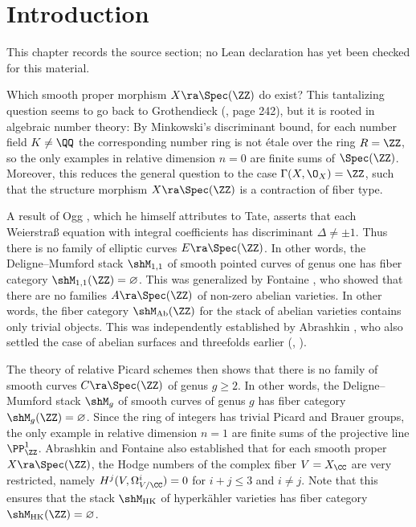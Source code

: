 \chapter{Introduction}
\label{no-enriques-surface-over-the-integers-chapter-01}

\begin{remark}
\label{no-enriques-surface-over-the-integers-chapter-01-source}
This chapter records the source section; no Lean declaration has yet been checked for this material.
\notready
\end{remark}

\label{Introduction}

Which   smooth proper morphism $X\ra\Spec(\ZZ)$ do exist?  This tantalizing question seems to go  back to
Grothendieck (\cite{Mazur-1986}, page 242), but it is rooted in algebraic number theory:
By   Minkowski's discriminant bound, for each number field $K\neq \QQ$ the corresponding
number ring  is not   \'etale over the ring $R=\ZZ$, so the only examples
in relative dimension $n=0$ are finite sums of $\Spec(\ZZ)$. Moreover, this reduces the general question  to  the
case $\Gamma(X,\O_X)=\ZZ$, such that the structure morphism  $X\ra\Spec(\ZZ)$ is a   contraction of fiber type.

A result of Ogg \cite{Ogg-1966}, which he himself attributes to Tate, asserts that each Weierstra\ss{} equation with integral
coefficients has discriminant $\Delta\neq \pm 1$.
Thus there is no family of elliptic curves
$E\ra\Spec(\ZZ)$. In other words, the Deligne--Mumford stack $\shM_{1,1}$ of smooth pointed curves of genus one
has  fiber category $\shM_{1,1}(\ZZ)=\varnothing$.
This was generalized by Fontaine \cite{Fontaine-1985},
who showed that there are no families $A\ra\Spec(\ZZ)$  of non-zero abelian varieties.
In other words, the  fiber category $\shM_{\text{Ab}}(\ZZ)$ for the  stack
of   abelian varieties contains only  trivial objects.
This was independently established by Abrashkin \cite{Abrashkin-1985}, who also settled the case of abelian surfaces and   threefolds earlier
(\cite{Abrashkin-1976}, \cite{Abrashkin-1977}).

The theory   of relative Picard schemes \cite{FGA-V} then shows that there is no family of smooth curves $C\ra\Spec(\ZZ)$
of genus $g\geq 2$. In other words, the Deligne--Mumford stack $\shM_g$ of smooth curves of genus $g$ has fiber category
$\shM_g(\ZZ)=\varnothing$.
Since the ring of integers has trivial Picard and Brauer groups, the only example in relative dimension $n=1$
are finite sums of the projective line $\PP^1_\ZZ$.
Abrashkin \cite{Abrashkin-1990} and Fontaine \cite{Fontaine-1993}
also established that for each smooth proper $X\ra\Spec(\ZZ)$, the Hodge numbers of the complex fiber $V=X_\CC$
are very restricted, namely
$H^j(V,\Omega^i_{V/\CC}) = 0$ for $i+j\leq 3$ and $i\neq j$.
Note that this ensures that the   stack $\shM_{\text{HK}}$ of hyperk\"ahler varieties has fiber category
$\shM_{\text{HK}}(\ZZ)=\varnothing$.

